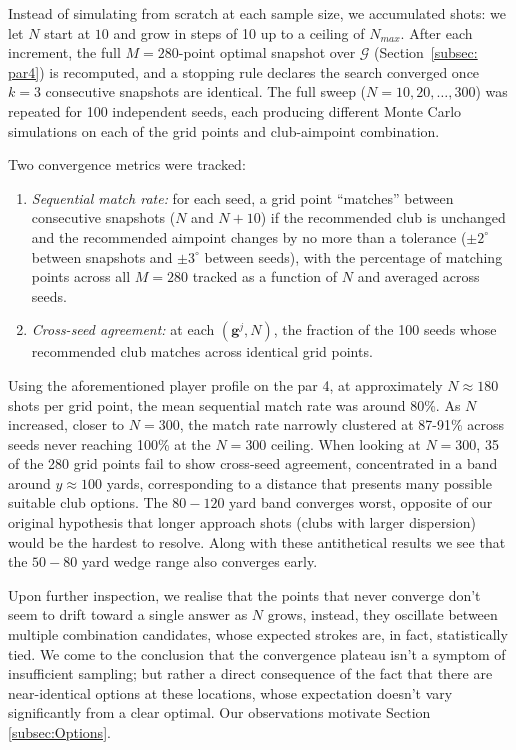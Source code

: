 \documentclass[11pt, letterpaper]{article}
\begin{document}
Instead of simulating from scratch at each sample size, we accumulated shots: we let $N$ start at $10$ and grow in steps of 10 up to a ceiling of $N_{max}$. After each increment, the full $M = 280$-point optimal snapshot over $\mathcal{G}$ (Section~\ref{subsec: par4})  is recomputed, and a stopping rule declares the search converged once $k = 3$ consecutive snapshots are identical. The full sweep ($N= 10, 20, \ldots, 300$) was repeated for 100 independent seeds, each producing different Monte Carlo simulations on each of the grid points and club-aimpoint combination.


Two convergence metrics were tracked: 
\begin{enumerate}
    \item \textit{Sequential match rate:} for each seed, a grid point ``matches'' between consecutive snapshots ($N$ and $N+10$) if the recommended club is unchanged and the recommended aimpoint changes by no more than a tolerance ($\pm 2^\circ$ between snapshots and $\pm3^\circ$  between seeds), with the percentage of matching points across all $M = 280$ tracked as a function of $N$ and averaged across seeds.
    \item \textit{Cross-seed agreement:} at each $(\mathbf{g}^j, N)$, the fraction of the 100 seeds whose recommended club matches across identical grid points.
\end{enumerate}

Using the aforementioned player profile on the par 4, at approximately $N \approx 180$ shots per grid point, the mean sequential match rate was around 80\%. As $N$ increased, closer to $N = 300$, the match rate narrowly clustered at 87-91\% across seeds never reaching 100\% at the $N = 300$ ceiling. When looking at $N = 300$, 35 of the 280 grid points fail to show cross-seed agreement, concentrated in a band around $y \approx 100$ yards, corresponding to a distance that presents many possible suitable club options. The $80-120$ yard band converges worst, opposite of our original hypothesis that longer approach shots (clubs with larger dispersion) would be the hardest to resolve. Along with these antithetical results we see that the $50-80$ yard wedge range also converges early. 

Upon further inspection, we realise that the points that never converge don't seem to drift toward a single answer as $N$ grows, instead, they oscillate between multiple combination candidates, whose expected strokes are, in fact, statistically tied. We come to the conclusion that the convergence plateau isn't a symptom of insufficient sampling; but rather a direct consequence of the fact that there are near-identical options at these locations, whose expectation doesn't vary significantly from a clear optimal. Our observations motivate Section \ref{subsec:Options}.
\end{document}
